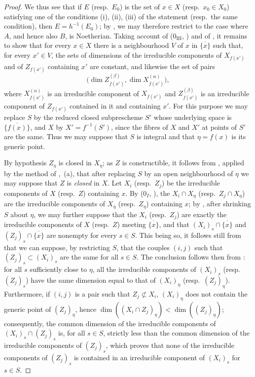 \begin{proof}
We thus see that if $E$ (resp.~$E_0$) is the set of $x\in X$ (resp.~$x_0\in X_0$) satisfying one of the conditions (i), (ii), (iii) of the statement (resp.~the same condition), then $E=h^{-1}(E_0)$; by , we may therefore restrict to the case where $A$, and hence also $B$, is Noetherian.
Taking account of ($0_{\mathrm{III}}$, ) and of , it remains to show that for every $x\in X$ there is a neighbourhood $V$ of $x$ in $\overline{\{x\}}$ such that, for every $x'\in V$, the sets of dimensions of the irreducible components of $X_{f(x')}$ and of $Z_{f(x')}$ containing $x'$ are constant, and likewise the set of pairs
\[
  \bigl(\dim Z_{f(x')}^{(\beta)},\dim X_{f(x')}^{(\alpha)}\bigr),
\]
where $X_{f(x')}^{(\alpha)}$ is an irreducible component of $X_{f(x')}$ and $Z_{f(x')}^{(\beta)}$ is an irreducible component of $Z_{f(x')}$ contained in it and containing $x'$.
For this purpose we may replace $S$ by the reduced closed subprescheme $S'$ whose underlying space is $\overline{\{f(x)\}}$, and $X$ by $X'=f^{-1}(S')$, since the fibres of $X$ and $X'$ at points of $S'$ are the same.
Thus we may suppose that $S$ is integral and that $\eta=f(x)$ is its generic point.

By hypothesis $Z_\eta$ is closed in $X_\eta$; as $Z$ is constructible, it follows from , applied by the method of ,~(a), that after replacing $S$ by an open neighbourhood of $\eta$ we may suppose that $Z$ is \emph{closed} in $X$.
Let $X_i$ (resp.~$Z_j$) be the irreducible components of $X$ (resp.~$Z$) containing $x$.
By ($0_I$, ), the $X_i\cap X_\eta$ (resp.~$Z_j\cap X_\eta$) are the irreducible components of $X_\eta$ (resp.~$Z_\eta$) containing $x$; by , after shrinking $S$ about $\eta$, we may further suppose that the $X_i$ (resp.~$Z_j$) are exactly the irreducible components of $X$ (resp.~$Z$) meeting $\overline{\{x\}}$, and that $(X_i)_s\cap\overline{\{x\}}$ and $(Z_j)_s\cap\overline{\{x\}}$ are nonempty for every $s\in S$.
This being so, it follows still from  that we can suppose, by restricting $S$, that the couples $(i,j)$ such that $(Z_j)_s\subset(X_i)_s$ are the same for all $s\in S$.
The conclusion follows then from : for all $s$ sufficiently close to $\eta$, all the irreducible components of $(X_i)_s$ (resp.~$(Z_j)_s$) have the same dimension equal to that of $(X_i)_\eta$ (resp.~$(Z_j)_\eta$).
Furthermore, if $(i,j)$ is a pair such that $Z_j\not\subset X_i$, $(X_i)_\eta$ does not contain the
generic point of $(Z_j)_\eta$, hence $\dim((X_i\cap Z_j)_\eta)<\dim((Z_j)_\eta)$; consequently, the common dimension of the irreducible components of $(X_i)_s\cap(Z_j)_s$ is, for all $s\in S$, strictly less than the common dimension of the irreducible components of $(Z_j)_s$, which proves that none of the irreducible components of $(Z_j)_s$ is contained in an irreducible component of $(X_i)_s$ for $s\in S$.
\end{proof}

